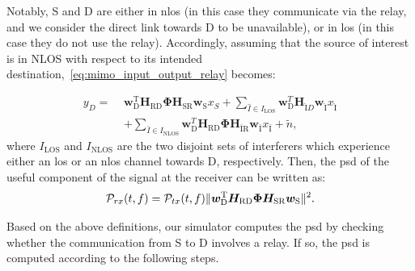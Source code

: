 Notably, S and D are either in \gls{nlos} (in this case they communicate via the relay, and we consider the direct link towards D to be unavailable), or in \gls{los} (in this case they do not use the relay). %
Accordingly, assuming that the source of interest is in NLOS with respect to its intended destination,~\eqref{eq:mimo_input_output_relay} becomes:

\begin{equation}
\label{eq:mimo_input_output_relay_reduced}
\begin{aligned}
    y_{D} = \,\, & \bm{w}_{\mathrm{D}}^{\mathrm{T}} \bm{H}_{\mathrm{RD}} \bm{\Phi} \bm{H}_{\mathrm{SR}} \bm{w}_{\mathrm{S}} x_{S} + \sum_{\hat{I} \in  I_{\mathrm{LOS}}} \bm{w}_{\mathrm{D}}^{T} \bm{H}_{\mathrm{\hat{I}} D} \bm{w}_{\mathrm{\hat{I}}} x_{\mathrm{\hat{I}}} \\
  & + \sum_{ \bar{I} \in I_{\mathrm{NLOS}}} \bm{w}_{\mathrm{D}}^{T} \bm{H}_{\mathrm{RD}} \bm{\Phi} \bm{H}_{\mathrm{\bar{I} R}}  \bm{w}_{\mathrm{\bar{I}}} x_{\mathrm{\bar{I}}} + \tilde{n},
\end{aligned}
\end{equation}
where $I_{\mathrm{LOS}}$ and $I_{\mathrm{NLOS}}$ are the two disjoint sets of interferers which experience either an \gls{los} or an \gls{nlos} channel towards D, respectively.
Then, the \gls{psd} of the useful component of the signal at the receiver can be written as:
\begin{equation}
\label{eq:psd_relay}
\mathcal{P}_{r x}(t, f) = \mathcal{P}_{t x}(t, f) \lVert \bm{w}_{\textrm D}^{\textrm T} \bm{H}_{\textrm {RD}} \bm{\Phi} \bm{H}_{\textrm {SR}} \bm{w}_{\textrm S} \rVert^2.
\end{equation}

Based on the above definitions, our simulator computes the \gls{psd} by checking whether the communication from S to D involves a relay. 
If so, the \gls{psd} is computed according to the following steps.


